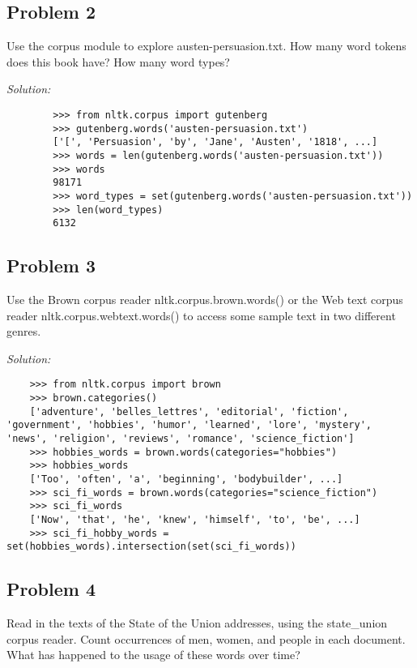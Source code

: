 \documentclass[11pt]{article}
\newenvironment{solution}{
	\vspace{10px}\noindent\emph{Solution:}
}{
	\vspace{10px}
}
\begin{document}
\subsection*{Problem 2}
Use the corpus module to explore austen-persuasion.txt. How many word tokens does this book have? How many word types?

\begin{solution}
	\begin{lstlisting}
		>>> from nltk.corpus import gutenberg
		>>> gutenberg.words('austen-persuasion.txt')
		['[', 'Persuasion', 'by', 'Jane', 'Austen', '1818', ...]
		>>> words = len(gutenberg.words('austen-persuasion.txt'))
		>>> words
		98171
		>>> word_types = set(gutenberg.words('austen-persuasion.txt'))
		>>> len(word_types)
		6132
	\end{lstlisting}
\end{solution}  


\subsection*{Problem 3}
Use the Brown corpus reader nltk.corpus.brown.words() or the Web text corpus reader nltk.corpus.webtext.words() to access some sample text in two different genres.

\begin{solution}
	\begin{lstlisting}
	>>> from nltk.corpus import brown
	>>> brown.categories()
	['adventure', 'belles_lettres', 'editorial', 'fiction', 'government', 'hobbies', 'humor', 'learned', 'lore', 'mystery', 'news', 'religion', 'reviews', 'romance', 'science_fiction']
	>>> hobbies_words = brown.words(categories="hobbies")
	>>> hobbies_words
	['Too', 'often', 'a', 'beginning', 'bodybuilder', ...]
	>>> sci_fi_words = brown.words(categories="science_fiction")
	>>> sci_fi_words
	['Now', 'that', 'he', 'knew', 'himself', 'to', 'be', ...]
	>>> sci_fi_hobby_words = set(hobbies_words).intersection(set(sci_fi_words))
	\end{lstlisting}
\end{solution}  


\subsection*{Problem 4}
Read in the texts of the State of the Union addresses, using the state\_union corpus reader. Count occurrences of men, women, and people in each document. What has happened to the usage of these words over time?
\end{document}
